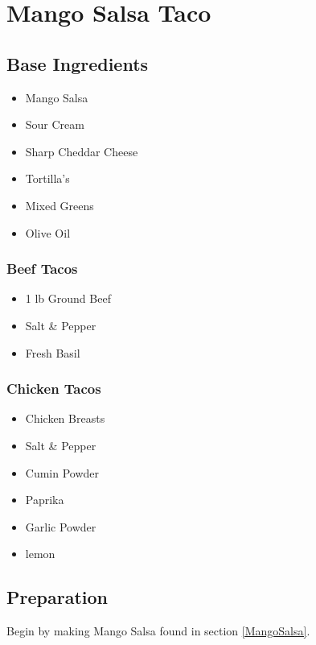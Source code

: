 \thispagestyle{fancy}
\section{Mango Salsa Taco}
\AddToShipoutPicture*{\MangoSalsaTaco}

\subsection*{Base Ingredients}
\begin{multicols}{3}
	\begin{itemize}
		\item Mango Salsa
		\item Sour Cream
		\item Sharp Cheddar Cheese
		\item Tortilla's
		\item Mixed Greens
		\item Olive Oil
	\end{itemize}
\end{multicols}

\subsubsection*{Beef Tacos}
\begin{multicols}{3}
	\begin{itemize}
		\item 1 lb Ground Beef 
		\item Salt \& Pepper
		\item Fresh Basil
	\end{itemize}
\end{multicols}

\subsubsection*{Chicken Tacos}
\begin{multicols}{3}
	\begin{itemize}
		\item Chicken Breasts
		\item Salt \& Pepper
		\item Cumin Powder
		\item Paprika
		\item Garlic Powder
		\item lemon
	\end{itemize}
\end{multicols}

\subsection*{Preparation}
Begin by making Mango Salsa found in section \ref{MangoSalsa}.

